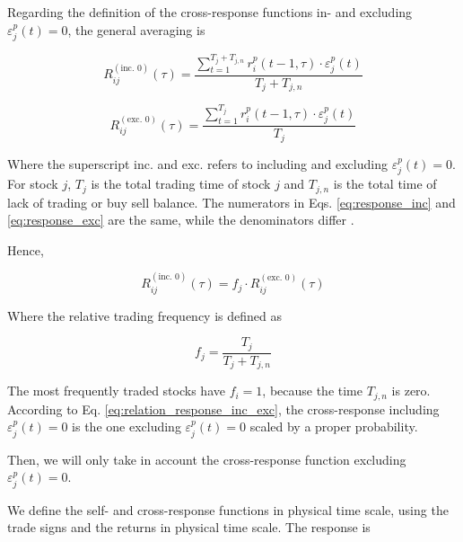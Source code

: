 Regarding the definition of the cross-response functions in- and excluding
$\varepsilon^{p}_j \left( t\right) = 0$, the general averaging is

\begin{equation}\label{eq:response_inc}
    R_{ij}^{\left(\text{inc. }0\right)}\left(\tau\right)=
    \frac{\sum_{t=1}^{T_{j}+T_{j,n}} r^{p}_{i}\left(t - 1,\tau\right)
    \cdot\varepsilon_{j}^{p}\left(t \right)}{T_{j}+T_{j,n}}
\end{equation}

\begin{equation}\label{eq:response_exc}
    R_{ij}^{\left(\text{exc. }0\right)}\left(\tau\right)=
    \frac{\sum_{t=1}^{T_{j}} r^{p}_{i}\left(t - 1,\tau\right)
    \cdot\varepsilon_{j}^{p} \left(t\right)}{T_{j}}
\end{equation}

Where the superscript inc. and exc. refers to including and excluding
$\varepsilon^{p}_j \left( t\right) = 0$. For stock $j$, $T_j$  is the total
trading time of stock $j$ and $T_{j,n}$ is the total time of lack of trading or
buy sell balance. The numerators in Eqs. \ref{eq:response_inc} and
\ref{eq:response_exc} are the same, while the denominators differ
\cite{Wang_2016_avg}.

Hence,

\begin{equation}\label{eq:relation_response_inc_exc}
    R_{ij}^{\left(\text{inc. }0\right)}\left(\tau\right)=f_{j}
    \cdot R_{ij}^{\left(\text{exc. }0\right)}\left(\tau\right)
\end{equation}

Where the relative trading frequency is defined as \cite{Wang_2016_avg}

\begin{equation}\label{eq:response_trading_frequency}
    f_{j}=\frac{T_{j}}{T_{j}+T_{j,n}}
\end{equation}

The most frequently traded stocks have $f_{i} = 1$, because the time $T_{j,n}$
is zero. According to Eq. \ref{eq:relation_response_inc_exc}, the
cross-response including $\varepsilon^{p}_j \left( t\right) = 0$ is the one
excluding $\varepsilon^{p}_j \left( t\right) = 0$ scaled by a proper
probability.

Then, we will only take in account the cross-response function excluding
$\varepsilon^{p}_j \left( t\right) = 0$.

We define the self- and cross-response functions in physical time scale, using
the trade signs and the returns in physical time scale. The response is

